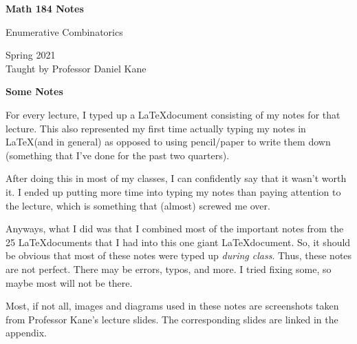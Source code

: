 \documentclass[letterpaper]{article}
\begin{document}
\begin{titlepage}
    \begin{center}
        \vspace*{1cm}
            
        \Huge
        \textbf{Math 184 Notes}
            
        \vspace{0.5cm}
        \LARGE
        Enumerative Combinatorics
            
        \vspace{1.5cm}
            
        \vfill
            
        Spring 2021\\
        Taught by Professor Daniel Kane
    \end{center}
\end{titlepage}

\thispagestyle{plain}
\begin{center}
    \Large
    \textbf{Some Notes}
\end{center}
For every lecture, I typed up a \LaTeX document consisting of my notes for that lecture. This also represented my first time actually typing my notes in \LaTeX (and in general) as opposed to using pencil/paper to write them down (something that I've done for the past two quarters).

\bigskip 

After doing this in most of my classes, I can confidently say that it wasn't worth it. I ended up putting more time into typing my notes than paying attention to the lecture, which is something that (almost) screwed me over. 

\bigskip 

Anyways, what I did was that I combined most of the important notes from the 25 \LaTeX documents that I had into this one giant \LaTeX document. So, it should be obvious that most of these notes were typed up \emph{during class}. Thus, these notes are not perfect. There may be errors, typos, and more. I tried fixing some, so maybe most will not be there. 

\bigskip 

Most, if not all, images and diagrams used in these notes are screenshots taken from Professor Kane's lecture slides. The corresponding slides are linked in the appendix. 

\newpage 

\begingroup
    \renewcommand\contentsname{Table of Contents}
    \tableofcontents
\endgroup
\end{document}
